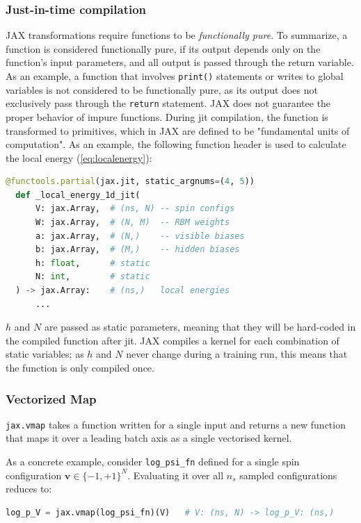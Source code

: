 \documentclass[10pt,a4paper]{article}
\numberwithin{equation}{section}
\begin{document}
\subsubsection{Just-in-time compilation}
JAX transformations require functions to be \textit{functionally pure}. To summarize, a function is considered functionally pure, if its output depends only on the function's input parameters, and all output is passed through the return variable. As an example, a function that involves \texttt{print()} statements or writes to global variables is not considered to be functionally pure, as its output does not exclusively pass through the \texttt{return} statement. JAX does not guarantee the proper behavior of impure functions. During \gls{jit} compilation, the function is transformed to primitives, which in JAX are defined to be "fundamental units of computation"\cite{jaxGlossaryTerms}. As an example, the following function header is used to calculate the local energy (\autoref{eq:localenergy}):

\begin{lstlisting}[language=Python]
  @functools.partial(jax.jit, static_argnums=(4, 5))
  def _local_energy_1d_jit(
      V: jax.Array,  # (ns, N) -- spin configs
      W: jax.Array,  # (N, M)  -- RBM weights
      a: jax.Array,  # (N,)    -- visible biases
      b: jax.Array,  # (M,)    -- hidden biases
      h: float,      # static
      N: int,        # static
  ) -> jax.Array:    # (ns,)   local energies
      ...
  \end{lstlisting}
$h$ and $N$ are passed as static parameters, meaning that they will be hard-coded in the compiled function after \gls{jit}. JAX compiles a kernel for each combination of static variables; as $h$ and $N$ never change during a training run, this means that the function is only compiled once.

\subsubsection{Vectorized Map}

\texttt{jax.vmap} takes a function written for a single input and returns a new function that maps it over a leading batch axis as a single vectorised kernel.

As a concrete example, consider \texttt{log\_psi\_fn} defined for a single spin configuration $\mathbf{v} \in \{-1,+1\}^N$. Evaluating it over all $n_s$ sampled configurations reduces to:

\begin{lstlisting}[language=Python]
log_p_V = jax.vmap(log_psi_fn)(V)   # V: (ns, N) -> log_p_V: (ns,)
\end{lstlisting}
\end{document}
